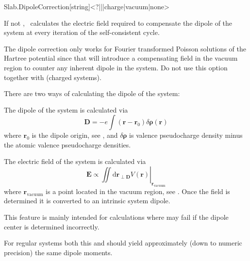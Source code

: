 \begin{fdfentry}{Slab.DipoleCorrection}[string]<?|\fdftrue|\fdffalse|charge|vacuum|none>
  
  If not \fdffalse, \siesta\ calculates the electric field required to
  compensate the dipole of the system at every iteration of the
  self-consistent cycle.

  The dipole correction only works for Fourier transformed Poisson
  solutions of the Hartree potential since that will introduce a
  compensating field in the vacuum region to counter any inherent
  dipole in the system. Do not use this option together with
   (charged systems).

  There are two ways of calculating the dipole of the system:
  \begin{fdfoptions}


    The dipole of the system is calculated via
    \begin{equation}
      \mathbf D = - e \int(\mathbf r - \mathbf r_0) \delta\boldsymbol\rho(\mathbf r)
    \end{equation}
    where $\mathbf r_0$ is the dipole origin, see ,
    and $\delta\boldsymbol\rho$ is valence pseudocharge density minus
    the atomic valence pseudocharge densities.

    \option[vacuum]%

    The electric field of the system is calculated via
    \begin{equation}
      \mathbf E \propto \left.\iint \mathrm d \mathbf r_{\perp \mathbf D} V(\mathbf
        r)\right|_{\mathbf r_{\mathrm{vacuum}}}
    \end{equation}
    where $\mathbf r_{\mathrm{vacuum}}$ is a point located in the
    vacuum region, see . Once the field is
    determined it is converted to an intrinsic system dipole.

    This feature is mainly intended for 
    calculations where  may fail if the dipole
    center is determined incorrectly.

    For regular systems both this and  should yield
    approximately (down to numeric precision) the same dipole moments.

  \end{fdfoptions}


\end{fdfentry}
